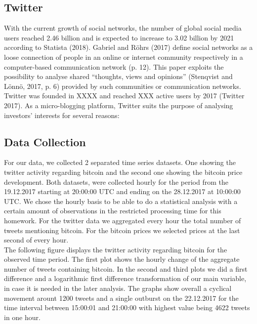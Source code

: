 \documentclass[a4paper,american,12pt]{article}
\begin{document}
\begin{spacing}{1.2}
\subsection{Twitter}
With the current growth of social networks, the number of global social media users reached 2.46 billion and is expected to increase to 3.02 billion by 2021 according to Statista (2018). Gabriel and Röhrs (2017) define social networks as a loose connection of people in an online or internet community respectively in a computer-based communication network (p. 12). This paper exploits the possibility to analyse shared “thoughts, views and opinions” (Stenqvist and Lönnö, 2017, p. 6) provided by such communities or communication networks.\newline
Twitter was founded in XXXX and reached XXX active users by 2017 (Twitter 2017). As a micro-blogging platform, Twitter suits the purpose of analysing investors’ interests for several reasons:



		
\subsection{Data Collection}
For our data, we collected 2 separated time series datasets. One showing the twitter activity regarding bitcoin and the second one showing the bitcoin price development. Both datasets, were collected hourly for the period from the 19.12.2017 starting at 20:00:00 UTC and ending on the 28.12.2017 at 10:00:00 UTC. We chose the hourly basis to be able to do a statistical analysis with a certain amount of observations in the restricted processing time for this homework. For the twitter data we aggregated every hour the total number of tweets mentioning bitcoin. For the bitcoin prices we selected prices at the last second of every hour.\\
The following figure displays the twitter activity regarding bitcoin for the observed time period. The first plot shows the hourly change of the aggregate number of tweets containing bitcoin. In the second and third plots we did a first difference and a logarithmic first difference transformation of our main variable, in case it is needed in the later analysis. The graphs show overall a cyclical movement arount 1200 tweets and a single outburst on the 22.12.2017 for the time interval between 15:00:01 and 21:00:00 with highest value being 4622 tweets in one hour.\\


\end{spacing}
\end{document}
